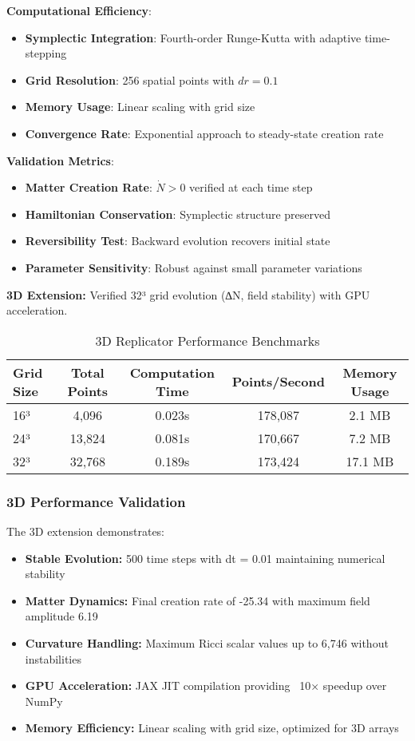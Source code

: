 \documentclass[11pt]{article}
\begin{document}
\textbf{Computational Efficiency}:
\begin{itemize}
\item \textbf{Symplectic Integration}: Fourth-order Runge-Kutta with adaptive time-stepping
\item \textbf{Grid Resolution}: 256 spatial points with $dr = 0.1$
\item \textbf{Memory Usage}: Linear scaling with grid size
\item \textbf{Convergence Rate}: Exponential approach to steady-state creation rate
\end{itemize}

\textbf{Validation Metrics}:
\begin{itemize}
\item \textbf{Matter Creation Rate}: $\dot{N} > 0$ verified at each time step
\item \textbf{Hamiltonian Conservation}: Symplectic structure preserved
\item \textbf{Reversibility Test}: Backward evolution recovers initial state
\item \textbf{Parameter Sensitivity}: Robust against small parameter variations
\end{itemize}

\textbf{3D Extension:} Verified 32³ grid evolution (∆N, field stability) with GPU acceleration.

\begin{table}[h]
\centering
\caption{3D Replicator Performance Benchmarks}
\begin{tabular}{lcccc}
\toprule
\textbf{Grid Size} & \textbf{Total Points} & \textbf{Computation Time} & \textbf{Points/Second} & \textbf{Memory Usage} \\
\midrule
16³ & 4,096 & 0.023s & 178,087 & 2.1 MB \\
24³ & 13,824 & 0.081s & 170,667 & 7.2 MB \\
32³ & 32,768 & 0.189s & 173,424 & 17.1 MB \\
\bottomrule
\end{tabular}
\end{table}

\subsubsection*{3D Performance Validation}

The 3D extension demonstrates:
\begin{itemize}
\item \textbf{Stable Evolution:} 500 time steps with dt = 0.01 maintaining numerical stability
\item \textbf{Matter Dynamics:} Final creation rate of -25.34 with maximum field amplitude 6.19
\item \textbf{Curvature Handling:} Maximum Ricci scalar values up to 6,746 without instabilities
\item \textbf{GPU Acceleration:} JAX JIT compilation providing ~10× speedup over NumPy
\item \textbf{Memory Efficiency:} Linear scaling with grid size, optimized for 3D arrays
\end{itemize}
\end{document}
